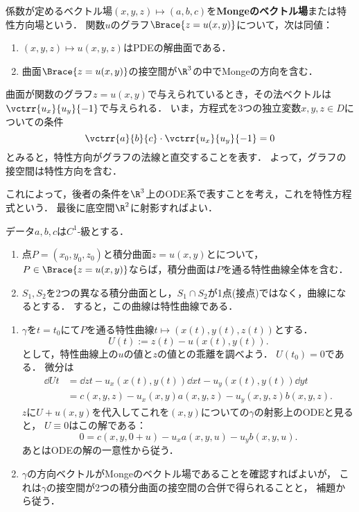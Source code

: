 \documentclass[uplatex,dvipdfmx]{jsreport}
\begin{document}
\begin{lemma}[Mongeベクトル場による幾何学的翻訳]
    係数が定めるベクトル場$(x,y,z)\mapsto(a,b,c)$を\textbf{Mongeのベクトル場}\cite{吉田耕作-微分方程式}または特性方向場\cite{John-PDE}という．
    関数$u$のグラフ$\Brace{z=u(x,y)}$について，次は同値：
    \begin{enumerate}
        \item $(x,y,z)\mapsto u(x,y,z)$はPDEの解曲面である．
        \item 曲面$\Brace{z=u(x,y)}$の接空間が$\R^3$の中でMongeの方向を含む．
    \end{enumerate}
\end{lemma}
\begin{Proof}
    曲面が関数のグラフ$z=u(x,y)$で与えられているとき，その法ベクトルは$\vctrr{u_x}{u_y}{-1}$で与えられる．
    いま，方程式を3つの独立変数$x,y,z\in D$についての条件
    \[\vctrr{a}{b}{c}\cdot\vctrr{u_x}{u_y}{-1}=0\]
    とみると，特性方向がグラフの法線と直交することを表す．
    よって，グラフの接空間は特性方向を含む．
\end{Proof}
\begin{remarks}
    これによって，後者の条件を$\R^3$上のODE系で表すことを考え，これを特性方程式という．
    最後に底空間$\R^2$に射影すればよい．
\end{remarks}

\begin{theorem}
    データ$a,b,c$は$C^1$-級とする．
    \begin{enumerate}
        \item 点$P=(x_0,y_0,z_0)$と積分曲面$z=u(x,y)$とについて，
        $P\in\Brace{z=u(x,y)}$ならば，積分曲面は$P$を通る特性曲線全体を含む．
        \item $S_1,S_2$を2つの異なる積分曲面とし，$S_1\cap S_2$が1点(接点)ではなく，曲線になるとする．
        すると，この曲線は特性曲線である．
    \end{enumerate}
\end{theorem}
\begin{Proof}\mbox{}
    \begin{enumerate}
        \item $\gamma$を$t=t_0$にて$P$を通る特性曲線$t\mapsto(x(t),y(t),z(t))$とする．
        \[U(t):=z(t)-u(x(t),y(t)).\]
        として，特性曲線上の$u$の値と$z$の値との乖離を調べよう．
        $U(t_0)=0$である．
        微分は
        \begin{align*}
            \dd{U}{t}&=\dd{z}{t}-u_x(x(t),y(t))\dd{x}{t}-u_y(x(t),y(t))\dd{y}{t}\\
            &=c(x,y,z)-u_x(x,y)a(x,y,z)-u_y(x,y,z)b(x,y,z).
        \end{align*}
        $z$に$U+u(x,y)$を代入してこれを$(x,y)$についての$\gamma$の射影上のODEと見ると，
        $U\equiv0$はこの解である：
        \[0=c(x,y,0+u)-u_xa(x,y,u)-u_yb(x,y,u).\]
        あとはODEの解の一意性から従う．
        \item $\gamma$の方向ベクトルがMongeのベクトル場であることを確認すればよいが，
        これは$\gamma$の接空間が2つの積分曲面の接空間の合併で得られることと，
        補題から従う．
    \end{enumerate}
\end{Proof}
\end{document}

